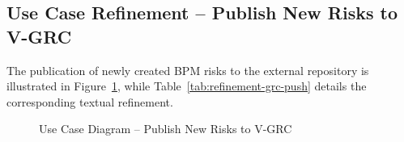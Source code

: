 \subsection{Use Case Refinement -- Publish New Risks to V-GRC}

The publication of newly created BPM risks to the external repository is illustrated in Figure~\ref{fig:usecase-grc-push}, while Table~\ref{tab:refinement-grc-push} details the corresponding textual refinement.

\begin{figure}[H]
\centering
{}
\caption{Use Case Diagram -- Publish New Risks to V-GRC}
\label{fig:usecase-grc-push}
\end{figure}

